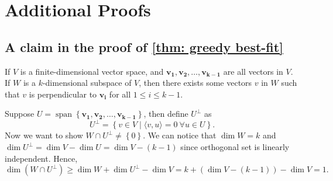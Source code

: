 \chapter{Additional Proofs}
\section{A claim in the proof of \autoref{thm: greedy best-fit}}\label{appendix}
\begin{claim}
	If \(V\) is a finite-dimensional vector space, and \(\mathbf{v_1}, \mathbf{v_2}, \dots , \mathbf{v_{k-1}}   \) are all vectors in \(V\). If \(W\) is a \(k\)-dimensional subspace of \(V\), then there exists some vectors \(v\) in \(W\)  such that \(v\) is perpendicular to \(\mathbf{v_i} \) for all \(1 \le i \le k-1\).       
\end{claim}
\begin{explanation}
	Suppose \(U= \operatorname{span}\left\{ \mathbf{v_1}, \mathbf{v_2}, \dots , \mathbf{v_{k-1}} \right\} \), then define \(U^{\perp } \) as 
	\[
		U^{\perp } = \left\{ v \in V \mid \langle v,u \rangle=0 \ \forall u \in U  \right\}  .
	\]
	Now we want to show \(W \cap U^{\perp } \neq \left\{ 0 \right\} \). We can notice that \(\dim W = k\) and \(\dim U^{\perp } = \dim V - \dim U = \dim V - (k-1)\) since orthogonal set is linearly independent. Hence,
	\[
		\dim \left( W \cap U^{\perp }  \right) \ge \dim W + \dim U^{\perp } - \dim V = k + \left( \dim V - (k-1) \right) - \dim V = 1.
	\]
\end{explanation}

